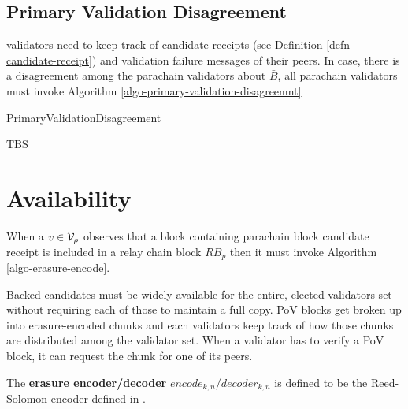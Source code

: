 

\subsection{Primary Validation Disagreement}
\label{sect-primary-validation-disagreemnt}
 validators need to keep track of candidate receipts
(see Definition \ref{defn-candidate-receipt}) and validation failure messages of
their peers. In case, there is a disagreement among the parachain validators
about $\bar{B}$, all parachain validators must invoke Algorithm
\ref{algo-primary-validation-disagreemnt}

\begin{algorithm}[H]
  \caption[]{\sc PrimaryValidationDisagreement}
  \label{algo-primary-validation-disagreemnt}
  \begin{algorithmic}[1]
    \Require{}

    \State TBS
  \end{algorithmic}
\end{algorithm}

\section{Availability}

When a $v \in \mathcal{V}_\rho$ observes that a block containing parachain block
candidate receipt is included in a relay chain block $RB_p$ then it must invoke
Algorithm \ref{algo-erasure-encode}.
\newline

Backed candidates must be widely available for the entire, elected validators
set without requiring each of those to maintain a full copy. PoV blocks get
broken up into erasure-encoded chunks and each validators keep track of how
those chunks are distributed among the validator set. When a validator has to
verify a PoV block, it can request the chunk for one of its peers.

\begin{definition}
  \label{defn-erasure-encoder-decoder}
  The {\bf erasure encoder/decoder} {\bf $encode_{k,n}/decoder_{k,n}$ } is
  defined to be the Reed-Solomon encoder defined in \cite{??}.
\end{definition}

